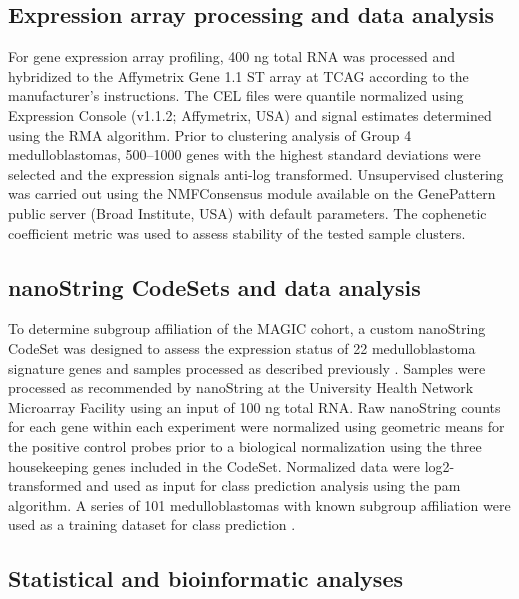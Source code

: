 \subsection{Expression array processing and data analysis}

For gene expression array profiling, 400 ng total RNA was processed and hybridized to the Affymetrix Gene 1.1 ST array at TCAG according to the manufacturer’s instructions. The CEL files were quantile normalized using Expression Console (v1.1.2; Affymetrix, USA) and signal estimates determined using the RMA algorithm.  Prior to clustering analysis of Group 4 medulloblastomas, 500--1000 genes with the highest standard deviations were selected and the expression signals anti-log transformed. Unsupervised clustering was carried out using the NMFConsensus module available on the GenePattern public server (Broad Institute, USA) with default parameters. The cophenetic coefficient metric was used to assess stability of the tested sample clusters.

\subsection{nanoString CodeSets and data analysis}

To determine subgroup affiliation of the MAGIC cohort, a custom nanoString CodeSet was designed to assess the expression status of 22 medulloblastoma signature genes and samples processed as described previously . Samples were processed as recommended by nanoString at the University Health Network Microarray Facility using an input of 100 ng total RNA. Raw nanoString counts for each gene within each experiment were normalized using geometric means for the positive control probes prior to a biological normalization using the three housekeeping genes included in the CodeSet. Normalized data were log2-transformed and used as input for class prediction analysis using the \gls{pam} algorithm. A series of 101 medulloblastomas with known subgroup affiliation were used as a training dataset for class prediction .

\subsection{Statistical and bioinformatic analyses}


